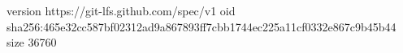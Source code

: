 version https://git-lfs.github.com/spec/v1
oid sha256:465e32cc587bf02312ad9a867893ff7cbb1744ec225a11cf0332e867c9b45b44
size 36760
